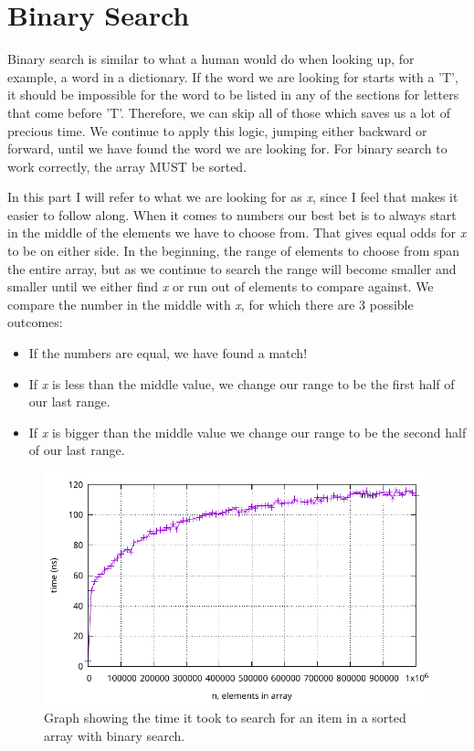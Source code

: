 \documentclass[a4paper, 11pt]{article}
\begin{document}
\section{Binary Search}
	Binary search is similar to what a human would do when looking up, for example, a word in a dictionary.
	If the word we are looking for starts with a 'T', it should be impossible for the word to be listed in any of the sections for letters that come before 'T'.
	Therefore, we can skip all of those which saves us a lot of precious time.
	We continue to apply this logic, jumping either backward or forward, until we have found the word we are looking for.
	For binary search to work correctly, the array MUST be sorted.
	\par
	In this part I will refer to what we are looking for as \textit{x}, since I feel that makes it easier to follow along.
	When it comes to numbers our best bet is to always start in the middle of the elements we have to choose from.
	That gives equal odds for \textit{x} to be on either side.
	In the beginning, the range of elements to choose from span the entire array,
	but as we continue to search the range will become smaller and smaller until we either find \textit{x} or run out of elements to compare against.
	We compare the number in the middle with \textit{x}, for which there are 3 possible outcomes:
	\begin{itemize}[label=\textbullet]
		\item If the numbers are equal, we have found a match!
		\item If \textit{x} is less than the middle value, we change our range to be the first half of our last range.
		\item If \textit{x} is bigger than the middle value we change our range to be the second half of our last range.
	\end{itemize}
	\begin{figure}[H]
		\centering
		\includegraphics[scale=0.8]{graphs/plot_binary.pdf}
		\caption{
			Graph showing the time it took to search for an item in a sorted array with binary search.
		}
	\end{figure}
\end{document}
